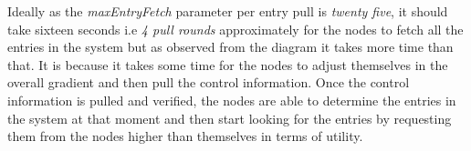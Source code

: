 \documentclass[a4paper, 11pt]{article}
\begin{document}
\par Ideally as the \textit{maxEntryFetch} parameter per entry pull is \textit{twenty five}, it should take sixteen seconds i.e \textit{4 pull rounds} approximately for the nodes to fetch all the entries in the system but as observed from the diagram it takes more time than that. It is because it takes some time for the nodes to adjust themselves in the overall gradient and then pull the control information. Once the control information is pulled and verified, the nodes are able to determine the entries in the system at that moment and then start looking for the entries by requesting them from the nodes higher than themselves in terms of utility.
\end{document}
